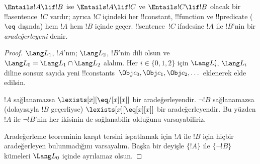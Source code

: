 



\begin{thm}
$\Entails !A\lif !B$ ise $\Entails !A\lif !C$ ve
$\Entails !C\lif !B$ olacak bir !!a{sentence}~$!C$ vardır; ayrıca
$!C$ içindeki her !!{constant}, !!{function} ve !!{predicate}
($\eq$ dışında) hem $!A$ hem $!B$ içinde geçer. !!{sentence}~$!C$
ifadesine $!A$ ile $!B$'nin bir \emph{aradeğerleyeni} denir.
\end{thm}

\begin{proof}
$\Lang L_1$, $!A$'nın; $\Lang L_2$, $!B$'nin dili olsun ve
$\Lang L_0=\Lang L_1\cap\Lang L_2$ alalım. Her
$i\in\{0,1,2\}$ için $\Lang L'_i$, $\Lang L_i$ diline sonsuz sayıda
yeni !!{constant}s~$\Obj c_0,\Obj c_1,\Obj c_2,\dots$ eklenerek elde
edilsin.

$!A$ sağlanamazsa $\lexists[x][\eq/[x][x]]$ bir aradeğerleyendir.
$\lnot !B$ sağlanamazsa (dolayısıyla $!B$ geçerliyse)
$\lexists[x][\eq[x][x]]$ bir aradeğerleyendir. Bu yüzden $!A$ ile
$\lnot !B$'nin her ikisinin de sağlanabilir olduğunu varsayabiliriz.

Aradeğerleme teoreminin karşıt tersini ispatlamak için $!A$ ile $!B$
için hiçbir aradeğerleyen bulunmadığını varsayalım. Başka bir deyişle
$\{!A\}$ ile $\{\lnot !B\}$ kümeleri $\Lang L_0$ içinde ayrılamaz
olsun.


\end{proof}
